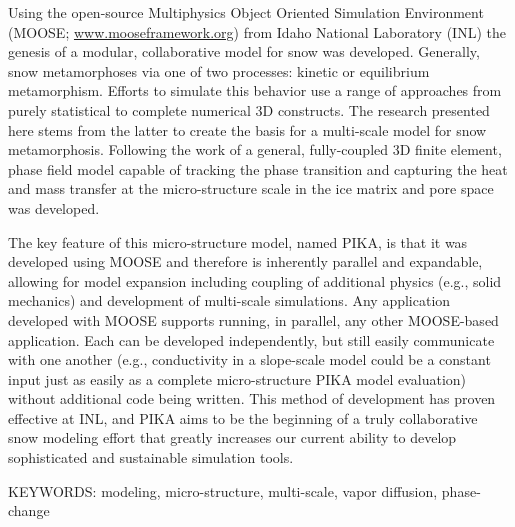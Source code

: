 Using the open-source Multiphysics Object Oriented Simulation Environment (MOOSE; \url{www.mooseframework.org}) from Idaho National Laboratory (INL) the genesis of a modular, collaborative model for snow was developed. Generally, snow metamorphoses via one of two processes: kinetic or equilibrium metamorphism. Efforts to simulate this behavior use a range of approaches from purely statistical to complete numerical 3D constructs. The research presented here stems from the latter to create the basis for a multi-scale model for snow metamorphosis. Following the work of \citet{kaempfer2009phase} a general, fully-coupled 3D finite element, phase field model capable of tracking the phase transition and capturing the heat and mass transfer at the micro-structure scale in the ice matrix and pore space was developed.

The key feature of this micro-structure model, named PIKA, is that it was developed using MOOSE and therefore is inherently parallel and expandable, allowing for model expansion including coupling of additional physics (e.g., solid mechanics) and development of multi-scale simulations. Any application developed with MOOSE supports running, in parallel, any other MOOSE-based application. Each can be developed independently, but still easily communicate with one another (e.g., conductivity in a slope-scale model could be a constant input just as easily as a complete micro-structure PIKA model evaluation) without additional code being written. This method of development has proven effective at INL, and PIKA aims to be the beginning of a truly collaborative snow modeling effort that greatly increases our current ability to develop sophisticated and sustainable simulation tools.

\bigskip
\noindent KEYWORDS: modeling, micro-structure, multi-scale, vapor diffusion, phase-change
